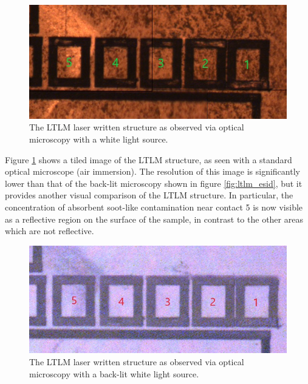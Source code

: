 \begin{refsection}
\begin{figure}[H]
    \centering
    \includegraphics[width=\linewidth]{Chapter7/Figs/Raster/ltlm_afmm_annotated.jpg}
    \caption{The LTLM laser written structure as observed via optical microscopy with a white light source.}
    \label{fig:ltlm_afmm}
\end{figure}

Figure \ref{fig:ltlm_afmm} shows a tiled image of the LTLM structure, as seen with a standard optical microscope (air immersion). The resolution of this image is significantly lower than that of the back-lit microscopy shown in figure \ref{fig:ltlm_esid}, but it provides another visual comparison of the LTLM structure. In particular, the concentration of absorbent soot-like contamination near contact 5 is now visible as a reflective region on the surface of the sample, in contrast to the other areas which are not reflective.

\begin{figure}[H]
    \centering
    \includegraphics[width=\linewidth]{Chapter7/Figs/Raster/ltlm_afmm_dark_annotated.jpg}
    \caption{The LTLM laser written structure as observed via optical microscopy with a back-lit white light source.}
    \label{fig:ltlm_afmm_dark}
\end{figure}


\end{refsection}
